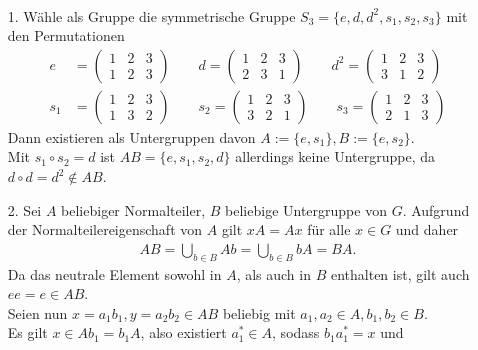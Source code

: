 \begin{solution}
\leavevmode \\
\begin{itemize}
  \item [1.] Wähle als Gruppe die symmetrische Gruppe $S_3 = \{e,d,d^2,s_1,s_2,s_3\}$
  mit den Permutationen
  \begin{align*}
  e &= \begin{pmatrix}
      1 & 2 & 3 \\
      1 & 2 & 3
    \end{pmatrix} \qquad
  d = \begin{pmatrix}
    1 & 2 & 3 \\
    2 & 3 & 1
  \end{pmatrix} \qquad
  d^2 = \begin{pmatrix}
    1 & 2 & 3 \\
    3 & 1 & 2
  \end{pmatrix} \\
  s_1 &= \begin{pmatrix}
    1 & 2 & 3 \\
    1 & 3 & 2
  \end{pmatrix} \qquad
  s_2 = \begin{pmatrix}
    1 & 2 & 3 \\
    3 & 2 & 1
  \end{pmatrix} \qquad
  s_3 = \begin{pmatrix}
    1 & 2 & 3 \\
    2 & 1 & 3
  \end{pmatrix}
  \end{align*}
  Dann existieren als Untergruppen davon $A := \{e,s_1\}, B := \{e,s_2\}$. \\
  Mit $s_1 \circ s_2 = d$ ist $AB = \{e,s_1,s_2, d\}$ allerdings keine Untergruppe, da $d \circ d = d^2 \notin AB$.
  \item [2.] Sei $A$ beliebiger Normalteiler, $B$ beliebige Untergruppe von $G$.
  Aufgrund der Normalteilereigenschaft von $A$ gilt $xA = Ax$ für alle
  $x \in G$ und daher
  \begin{align*}
    AB = \bigcup_{b \in B}Ab = \bigcup_{b \in B}bA = BA.
  \end{align*}
  Da das neutrale Element sowohl in $A$, als auch in $B$ enthalten ist, gilt auch
  $ee = e \in AB$. \\
  Seien nun $x= a_1b_1, y = a_2b_2 \in AB$ beliebig mit $a_1,a_2 \in A, b_1,b_2 \in B$. \\
  Es gilt $x \in Ab_1 = b_1A$, also existiert $a_1^* \in A$, sodass $b_1a_1^* = x$ und

\end{itemize}
\end{solution}
